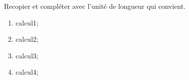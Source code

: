 \documentclass[exercice]{thedocument}%
\begin{document}
%
\smallskip\par\noindent Recopier et compléter avec l'unité de longueur qui
convient.
\begin{enumerate}
    \item \<calcul1;
    \item \<calcul2;
    \item \<calcul3;
    \item \<calcul4;
\end{enumerate}
\end{document}
